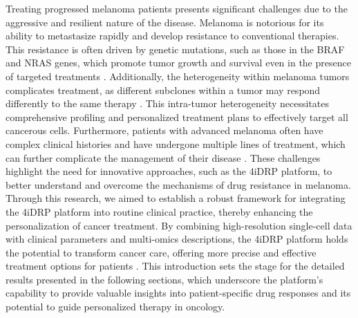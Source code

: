 Treating progressed melanoma patients presents significant challenges due to the aggressive and resilient nature of the disease.
Melanoma is notorious for its ability to metastasize rapidly and develop resistance to conventional therapies.
This resistance is often driven by genetic mutations, such as those in the BRAF and NRAS genes, which promote tumor growth and survival even in the presence of targeted treatments \cite{}.
Additionally, the heterogeneity within melanoma tumors complicates treatment, as different subclones within a tumor may respond differently to the same therapy \cite{}.
This intra-tumor heterogeneity necessitates comprehensive profiling and personalized treatment plans to effectively target all cancerous cells.
Furthermore, patients with advanced melanoma often have complex clinical histories and have undergone multiple lines of treatment, which can further complicate the management of their disease \cite{}.
These challenges highlight the need for innovative approaches, such as the 4iDRP platform, to better understand and overcome the mechanisms of drug resistance in melanoma.
Through this research, we aimed to establish a robust framework for integrating the 4iDRP platform into routine clinical practice, thereby enhancing the personalization of cancer treatment.
By combining high-resolution single-cell data with clinical parameters and multi-omics descriptions, the 4iDRP platform holds the potential to transform cancer care, offering more precise and effective treatment options for patients \cite{}.
This introduction sets the stage for the detailed results presented in the following sections, which underscore the platform's capability to provide valuable insights into patient-specific drug responses and its potential to guide personalized therapy in oncology.


